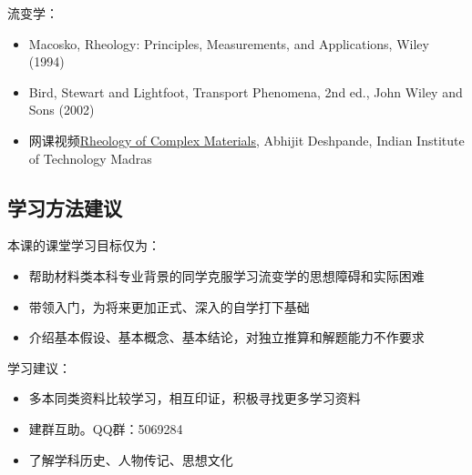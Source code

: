 \documentclass[main.tex]{subfiles}
\begin{document}
流变学：
\begin{itemize}
    \item Macosko, Rheology: Principles, Measurements, and Applications, Wiley (1994)
    \item Bird, Stewart and Lightfoot, Transport Phenomena, 2nd ed., John Wiley and Sons (2002)
    \item 网课视频\href{https://www.youtube.com/playlist?list=PLS4T7vo4vjrslTCBMjAjB3-dlpHVu7GkF}{Rheology of Complex Materials}, Abhijit Deshpande, Indian Institute of Technology Madras
\end{itemize}
\subsection{学习方法建议}
本课的课堂学习目标仅为：
\begin{itemize}
    \item 帮助材料类本科专业背景的同学克服学习流变学的思想障碍和实际困难
    \item 带领入门，为将来更加正式、深入的自学打下基础
    \item 介绍基本假设、基本概念、基本结论，对独立推算和解题能力不作要求
\end{itemize}
学习建议：
\begin{itemize}
    \item 多本同类资料比较学习，相互印证，积极寻找更多学习资料
    \item 建群互助。QQ群：5069284
    \item 了解学科历史、人物传记、思想文化
\end{itemize}
\end{document}
